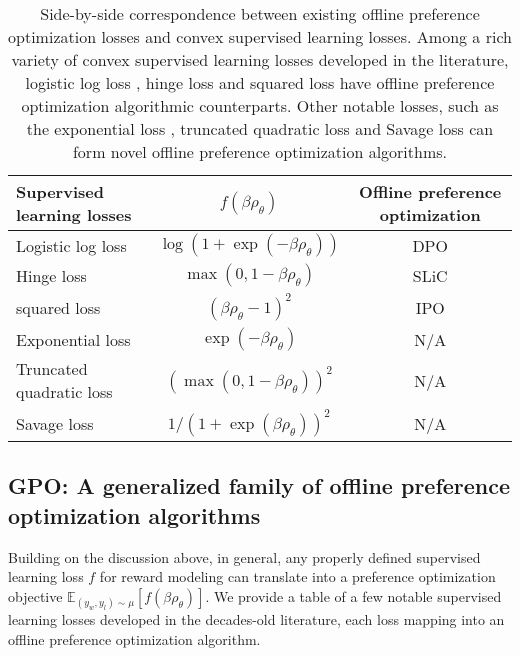 \begin{table*}
\centering
    \caption{Side-by-side correspondence between existing offline preference optimization losses and convex supervised learning losses. Among a rich variety of convex supervised learning losses developed in the literature, logistic log loss \citep{hastie2009elements}, hinge loss \citep{cortes1995support} and squared loss \citep{rosasco2004loss} have offline preference optimization algorithmic counterparts. Other notable losses, such as the exponential loss \citep{freund1995desicion}, truncated quadratic loss \citep{bartlett2006convexity} and Savage loss \citep{masnadi2008design} can form novel offline preference optimization algorithms. 
    \newline}
\begin{small}
\begin{sc}
 \begin{tabular}{l|c|c}\toprule[1.5pt]
 Supervised learning losses & $f(\beta\rho_\theta)$ & Offline preference  optimization
\\\midrule
Logistic log loss & \bf $\log\left(1+\exp(-\beta\rho_\theta)\right)$ & DPO \citep{rafailov2023direct} \\
Hinge loss & \bf $\max\left(0,1-\beta\rho_\theta\right)$ & SLiC \citep{zhao2023SLiC} \\
squared loss & \bf $\left(\beta\rho_\theta-1\right)^2$ & IPO \citep{azar2023general} \\
Exponential loss & \bf $\exp(-\beta\rho_\theta)$ & N/A \\
Truncated quadratic loss & \bf $\left(\max(0,1-\beta\rho_\theta)\right)^2$ & N/A \\
Savage loss & \bf $1/(1+\exp(\beta\rho_\theta))^2$ & N/A \\
\bottomrule
\end{tabular}
\end{sc}
\end{small}
\vskip -0.1in
\label{table:losses}
\end{table*}

\subsection{GPO: A generalized family of offline preference optimization algorithms}

Building on the discussion above,
in general, any properly defined supervised learning loss $f$ for reward modeling can translate into a preference optimization objective $\mathbb{E}_{(y_w,y_l)\sim\mu}\left[f(\beta\rho_\theta)\right]$. We provide a table of a few notable supervised learning losses developed in the decades-old literature, each loss mapping into an offline preference optimization algorithm.

